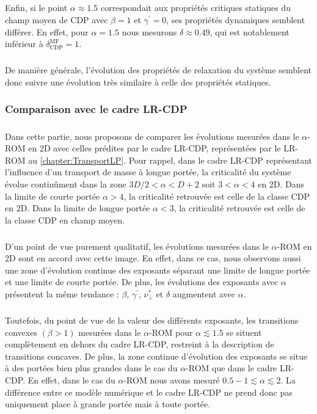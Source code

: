 \subparagraph{}Enfin, si le point $\alpha\approx 1.5$ correspondait aux propriétés critiques statiques du champ moyen de CDP avec $\beta=1$ et $\gamma^\prime=0$, ses propriétés dynamiques semblent différer. En effet, pour $\alpha = 1.5$ nous mesurons $\delta\approx 0.49$, qui est notablement inférieur à $\delta_\text{CDP}^\text{MF}=1$. 

\subparagraph{}De manière générale, l'évolution des propriétés de relaxation du système semblent donc suivre une évolution très similaire à celle des propriétés statiques.

\subsubsection{Comparaison avec le cadre LR-CDP}

\subparagraph{}Dans cette partie, nous proposons de comparer les évolutions mesurées dans le $\alpha$-ROM en 2D avec celles prédites par le cadre LR-CDP, représentées par le LR-ROM au \autoref{chapter:TransportLP}. Pour rappel, dans le cadre LR-CDP représentant l'influence d'un transport de masse à longue portée, la criticalité du système évolue continûment dans la zone $3D/2 < \alpha < D+2$ soit $3 < \alpha < 4$ en 2D. Dans la limite de courte portée $\alpha > 4$, la criticalité retrouvée est celle de la classe CDP en 2D. Dans la limite de longue portée $\alpha < 3$, la criticalité retrouvée est celle de la classe CDP en champ moyen. 

\subparagraph{}D'un point de vue purement qualitatif, les évolutions mesurées dans le $\alpha$-ROM en 2D sont en accord avec cette image. En effet, dans ce cas, nous observons aussi une zone d'évolution continue des exposants séparant une limite de longue portée et une limite de courte portée. De plus, les évolutions des exposants avec $\alpha$ présentent la même tendance : $\beta$, $\gamma^\prime$, $\nu_\perp^*$ et $\delta$ augmentent avec $\alpha$.

\subparagraph{}Toutefois, du point de vue de la valeur des différents exposants, les transitions convexes $(\beta > 1)$ mesurées dans le $\alpha$-ROM pour $\alpha \lesssim 1.5$ se situent complètement en dehors du cadre LR-CDP, restreint à la description de transitions concaves. De plus, la zone continue d'évolution des exposants se situe à des portées bien plus grandes dans le cas du $\alpha$-ROM que dans le cadre LR-CDP. En effet, dans le cas du $\alpha$-ROM nous avons mesuré $0.5-1 \lesssim \alpha \lesssim 2$. La différence entre ce modèle numérique et le cadre LR-CDP ne prend donc pas uniquement place à grande portée mais à toute portée.

